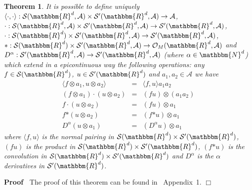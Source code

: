 \documentclass[11pt]{article}
\newcommand{\asterisk}{\mathord{*}}
\newenvironment{proof}{\noindent\textbf{Proof\ }}{\hspace*{\fill}$\Box$\medskip}
\newtheorem{theorem}{Theorem}
\begin{document}
\begin{theorem}
  It is possible to define uniquely $\langle \cdot, \cdot \rangle :
  \mathcal{S} (\mathbbm{R}^d, \mathcal{A}) \times \mathcal{S}' (\mathbbm{R}^d,
  \mathcal{A}) \rightarrow \mathcal{A}$, $\cdot : \mathcal{S} (\mathbbm{R}^d,
  \mathcal{A}) \times \mathcal{S}' (\mathbbm{R}^d, \mathcal{A}) \rightarrow
  \mathcal{S}' (\mathbbm{R}^d, \mathcal{A})$, $\cdot : \mathcal{S}
  (\mathbbm{R}^d) \times \mathcal{S}' (\mathbbm{R}^d, \mathcal{A}) \rightarrow
  \mathcal{S}' (\mathbbm{R}^d, \mathcal{A})$, $\asterisk : \mathcal{S}
  (\mathbbm{R}^d) \times \mathcal{S}' (\mathbbm{R}^d, \mathcal{A}) \rightarrow
  \mathcal{O}_M (\mathbbm{R}^d, \mathcal{A})$ and $D^{\alpha} : \mathcal{S}'
  (\mathbbm{R}^d, \mathcal{A}) \rightarrow \mathcal{S}' (\mathbbm{R}^d,
  \mathcal{A})$ (where $\alpha \in \mathbbm{N}^d$) which extend in a
  epicontinuous way the following operations: any $f \in \mathcal{S}
  (\mathbbm{R}^d)$, $u \in \mathcal{S}' (\mathbbm{R}^d)$ and $a_1, a_2 \in
  \mathcal{A}$ we have
  \[ \begin{array}{rll}
       \langle f \otimes a_1, u \otimes a_2 \rangle & = & \langle f, u \rangle
       a_1 a_2\\
       (f \otimes a_1) \cdot (u \otimes a_2) & = & (f u) \otimes (a_1 a_2)\\
       f \cdot (u \otimes a_2) & = & (f u) \otimes a_1\\
       f \asterisk (u \otimes a_2) & = & (f \asterisk u) \otimes a_1\\
       D^{\alpha} (u \otimes a_1) & = & (D^{\alpha} u) \otimes a_1
     \end{array} \]
  where $\langle f, u \rangle$ is the normal pairing in $\mathcal{S}
  (\mathbbm{R}^d) \times \mathcal{S}' (\mathbbm{R}^d)$, $(f u)$ is the product
  in $\mathcal{S} (\mathbbm{R}^d) \times \mathcal{S}' (\mathbbm{R}^d)$, $(f
  \asterisk u)$ is the convolution in $\mathcal{S} (\mathbbm{R}^d) \times
  \mathcal{S}' (\mathbbm{R}^d)$ and $D^{\alpha}$ is the $\alpha$ derivatives in
  $\mathcal{S}' (\mathbbm{R}^d)$.
\end{theorem}

\begin{proof}
  The proof of this theorem can be found in~{\cite{Amann2019}} Appendix~1.
\end{proof}
\end{document}
